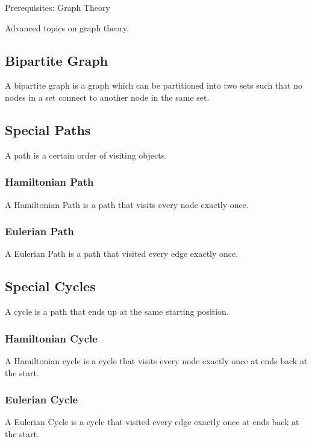 \documentclass[11pt,oneside]{book}
\begin{document}
Prerequisites: Graph Theory

Advanced topics on graph theory.

\subsection{Bipartite Graph}

A bipartite graph is a graph which can be partitioned into two sets such that no nodes in a set connect to another node in the same set.

\subsection{Special Paths}

A path is a certain order of visiting objects.

\subsubsection{Hamiltonian Path}

A Hamiltonian Path is a path that visits every node exactly once.

\subsubsection{Eulerian Path}

A Eulerian Path is a path that visited every edge exactly once.

\subsection{Special Cycles}

A cycle is a path that ends up at the same starting position.

\subsubsection{Hamiltonian Cycle}

A Hamiltonian cycle is a cycle that visits every node exactly once at ends back at the start.

\subsubsection{Eulerian Cycle}

A Eulerian Cycle is a cycle that visited every edge exactly once at ends back at the start.
\end{document}
